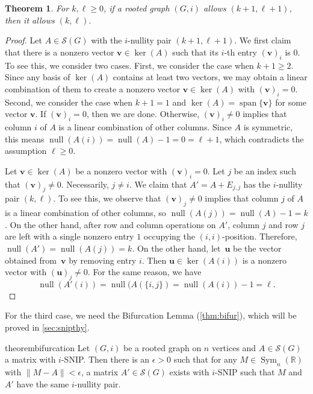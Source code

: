 \documentclass{article}
\newtheorem{theorem}{Theorem}[section]
\theoremstyle{definition}
\newcommand{\bu}{\mathbf{u}}
\newcommand{\bv}{\mathbf{v}}
\newcommand{\nul}{\operatorname{null}}
\newcommand{\vspan}{\operatorname{span}}
\newcommand{\mptn}{\mathcal{S}} %
\newcommand{\msym}[1][n]{\operatorname{Sym}_{#1}(\mathbb{R})}
\begin{document}
\begin{theorem}
\label{thm:sw}
For $k,\ell \geq 0$, if a rooted graph $(G,i)$ allows $(k+1,\ell+1)$, then it allows $(k,\ell)$.
\end{theorem}
\begin{proof}
Let $A\in\mptn(G)$ with the $i$-nullity pair $(k+1, \ell+1)$.  We first claim that there is a nonzero vector $\bv\in\ker(A)$ such that its $i$-th entry $(\bv)_i$ is $0$.  To see this, we consider two cases.  First, we consider the case when $k+1 \geq 2$.  Since any basis of $\ker(A)$ contains at least two vectors, we may obtain a linear combination of them to create a nonzero vector $\bv\in\ker(A)$ with $(\bv)_i = 0$.  Second, we consider the case when $k+1 = 1$ and $\ker(A) = \vspan\{\bv\}$ for some vector $\bv$.  If $(\bv)_i = 0$, then we are done.
Otherwise, $(\bv)_i \neq 0$ implies that column $i$ of $A$ is a linear combination of other columns.  Since $A$ is symmetric, this means $\nul(A(i)) = \nul(A) - 1 = 0 = \ell + 1$, which contradicts the assumption $\ell \geq 0$.

Let $\bv\in\ker(A)$ be a nonzero vector with $(\bv)_i = 0$.  Let $j$ be an index such that $(\bv)_j \neq 0$.  Necessarily, $j \neq i$.  We claim that $A' = A + E_{j,j}$ has the $i$-nullity pair $(k,\ell)$.  To see this, we observe that $(\bv)_j \neq 0$ implies that column $j$ of $A$ is a linear combination of other columns, so $\nul(A(j)) = \nul(A) - 1 = k$.
On the other hand, after row and column operations on $A'$, column $j$ and row $j$ are left with a single nonzero entry $1$ occupying the $(i,i)$-position.
Therefore, $\nul(A') = \nul(A(j)) = k$.  On the other hand, let~$\bu$ be the vector obtained from~$\bv$ by removing entry $i$.
Then $\bu\in\ker(A(i))$ is a nonzero vector with $(\bu)_j \neq 0$.
For the same reason, we have
\[
\nul(A'(i)) = \nul(A(\{i,j\}) = \nul(A(i)) - 1 = \ell.
\]
\end{proof}

For the third case, we need the Bifurcation Lemma (\cref{thm:bifur}), which will be proved in \cref{sec:snipthy}.

\begin{restatable}{theorem}{bifurcation}
\label{thm:bifur}
Let $(G,i)$ be a rooted graph on $n$ vertices and $A \in \mptn(G)$ a matrix with $i$-SNIP.  Then there is an $\epsilon > 0$ such that for any $M\in\msym$ with $\|M - A\| < \epsilon$, a matrix $A'\in\mptn(G)$ exists with $i$-SNIP such that $M$ and $A'$ have the same $i$-nullity pair.
\end{restatable}
\end{document}
